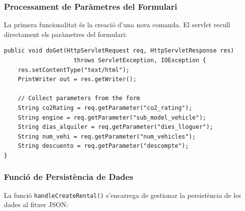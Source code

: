 \documentclass[12pt,a4paper]{article}
\begin{document}
\subsubsection{Processament de Paràmetres del Formulari}

La primera funcionalitat és la creació d'una nova comanda. El servlet recull directament els paràmetres del formulari:

\begin{lstlisting}[style=javastyle,caption=Recollida de paràmetres del formulari]
public void doGet(HttpServletRequest req, HttpServletResponse res)
                    throws ServletException, IOException {
    res.setContentType("text/html");
    PrintWriter out = res.getWriter();
    
    // Collect parameters from the form
    String co2Rating = req.getParameter("co2_rating");
    String engine = req.getParameter("sub_model_vehicle");
    String dias_alquiler = req.getParameter("dies_lloguer");
    String num_vehi = req.getParameter("num_vehicles");
    String descuento = req.getParameter("descompte");
}
\end{lstlisting}

\newpage
\subsubsection{Funció de Persistència de Dades}

La funció \texttt{handleCreateRental()} s'encarrega de gestionar la persistència de les dades al fitxer JSON:
\end{document}
